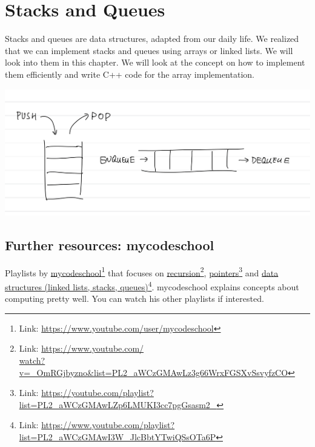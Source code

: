 \chapter{Stacks and Queues}

Stacks and queues are data structures, adapted from our daily life. We realized that we can implement stacks and queues using arrays or linked lists. We will look into them in this chapter. We will look at the concept on how to implement them efficiently and write C++ code for the array implementation.

\includegraphics[width=16cm]{images/ch6-stackqueue.png}

\section{Further resources: mycodeschool}

Playlists by 
\href{https://www.youtube.com/user/mycodeschool}{mycodeschool}\footnote{Link: \href{https://www.youtube.com/user/mycodeschool}{https://www.youtube.com/user/mycodeschool}}
that focuses on 
\href{https://www.youtube.com/watch?v=_OmRGjbyzno&list=PL2_aWCzGMAwLz3g66WrxFGSXvSsvyfzCO}{recursion}\footnote{Link: \href{https://www.youtube.com/watch?v=_OmRGjbyzno&list=PL2_aWCzGMAwLz3g66WrxFGSXvSsvyfzCO}{https://www.youtube.com/\\watch?v=\_OmRGjbyzno\&list=PL2\_aWCzGMAwLz3g66WrxFGSXvSsvyfzCO}}, 
\href{https://youtube.com/playlist?list=PL2_aWCzGMAwLZp6LMUKI3cc7pgGsasm2_}{pointers}\footnote{Link: \href{https://youtube.com/playlist?list=PL2_aWCzGMAwLZp6LMUKI3cc7pgGsasm2_}{https://youtube.com/playlist?list=PL2\_aWCzGMAwLZp6LMUKI3cc7pgGsasm2\_}} and 
\href{https://www.youtube.com/playlist?list=PL2_aWCzGMAwI3W_JlcBbtYTwiQSsOTa6P}{data structures (linked lists, stacks, queues)}\footnote{Link: \href{https://www.youtube.com/playlist?list=PL2_aWCzGMAwI3W_JlcBbtYTwiQSsOTa6P}{https://www.youtube.com/playlist?list=PL2\_aWCzGMAwI3W\_JlcBbtYTwiQSsOTa6P}}.
mycodeschool explains concepts about computing pretty well. You can watch his other playlists if interested.

